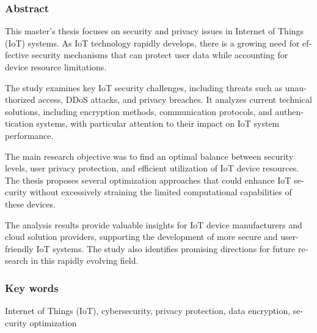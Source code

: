 \subsubsection*{Abstract} 
\begin{otherlanguage}{british}
This master's thesis focuses on security and privacy issues in Internet of Things (IoT) systems. As IoT technology rapidly develops, there is a growing need for effective security mechanisms that can protect user data while accounting for device resource limitations.

The study examines key IoT security challenges, including threats such as unauthorized access, DDoS attacks, and privacy breaches. It analyzes current technical solutions, including encryption methods, communication protocols, and authentication systems, with particular attention to their impact on IoT system performance.

The main research objective was to find an optimal balance between security levels, user privacy protection, and efficient utilization of IoT device resources. The thesis proposes several optimization approaches that could enhance IoT security without excessively straining the limited computational capabilities of these devices.

The analysis results provide valuable insights for IoT device manufacturers and cloud solution providers, supporting the development of more secure and user-friendly IoT systems. The study also identifies promising directions for future research in this rapidly evolving field.
\end{otherlanguage}
\subsubsection*{Key words}  
\begin{otherlanguage}{british}
Internet of Things (IoT), cybersecurity, privacy protection, data encryption, security optimization
\end{otherlanguage}

